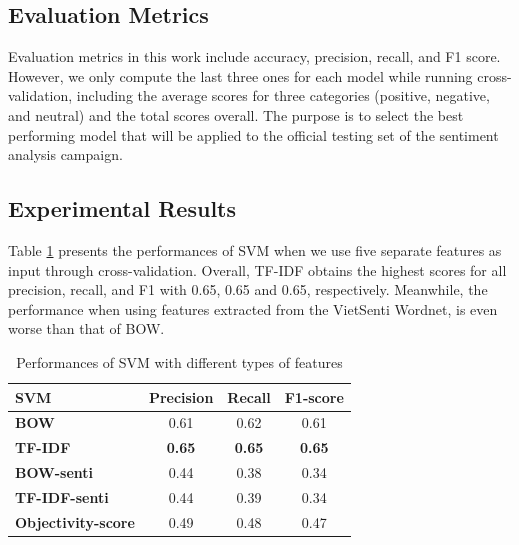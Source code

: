\documentclass[conference,compsoc]{IEEEtran}
\begin{document}
\subsection{Evaluation Metrics}

Evaluation metrics in this work include accuracy, precision, recall, and F1 score. However, we only compute the last three ones for each model while running cross-validation, including the average scores for three categories (positive, negative, and neutral) and the total scores overall. The purpose is to select the best performing model that will be applied to the official testing set of the sentiment analysis campaign.

\subsection{Experimental Results}

Table \ref{tb-SVM} presents the performances of SVM when we use five separate features as input through cross-validation. Overall, TF-IDF obtains the highest scores for all precision, recall, and F1 with 0.65, 0.65 and 0.65, respectively. Meanwhile, the performance when using features extracted from the VietSenti Wordnet, is even worse than that of BOW. 

\begin{table}[t]
\centering
\caption{Performances of SVM with different types of features}
\label{tb-SVM}
\begin{tabular}{|l|c|c|c|}
\hline
\textbf{SVM}             & \textbf{Precision} & \textbf{Recall} & \textbf{F1-score} \\ \hline
\textbf{BOW}             & 0.61               & 0.62            & 0.61              \\
\textbf{TF-IDF}          & \textbf{0.65}      & \textbf{0.65}   & \textbf{0.65}     \\
\textbf{BOW-senti}       & 0.44               & 0.38            & 0.34              \\
\textbf{TF-IDF-senti}    & 0.44               & 0.39            & 0.34              \\
\textbf{Objectivity-score} & 0.49               & 0.48            & 0.47              \\ \hline
\end{tabular}
\end{table}
\end{document}

